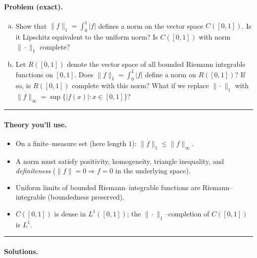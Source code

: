 \documentclass[12pt,a4paper]{article}
\theoremstyle{plain}
\theoremstyle{definition}
\theoremstyle{remark}
\theoremstyle{remark}
\begin{document}
\paragraph{Problem (exact).}
\begin{enumerate}[(a)]
	\item Show that $\|f\|_{1}=\int_{0}^{1}|f|$ defines a norm on the vector space $C([0,1])$.
	Is it Lipschitz equivalent to the uniform norm? Is $C([0,1])$ with norm $\|\cdot\|_{1}$ complete?
	
	\item Let $R([0,1])$ denote the vector space of all bounded Riemann integrable functions on $[0,1]$.
	Does $\|f\|_{1}=\int_{0}^{1}|f|$ define a norm on $R([0,1])$? If so, is $R([0,1])$ complete with this norm?
	What if we replace $\|\cdot\|_{1}$ with $\|f\|_{\infty}=\sup\{|f(x)|:x\in[0,1]\}$?
\end{enumerate}

\noindent\rule{\linewidth}{0.6pt}

\paragraph{Theory you’ll use.}
\begin{itemize}
	\item On a finite–measure set (here length $1$): $\displaystyle \|f\|_{1}\le \|f\|_{\infty}$.
	\item A norm must satisfy positivity, homogeneity, triangle inequality, and \emph{definiteness}
	($\|f\|=0 \Rightarrow f=0$ in the underlying space).
	\item Uniform limits of bounded Riemann–integrable functions are Riemann–integrable (boundedness preserved).
	\item $C([0,1])$ is dense in $L^{1}([0,1])$; the $\|\cdot\|_{1}$–completion of $C([0,1])$ is $L^{1}$.
\end{itemize}

\noindent\rule{\linewidth}{0.6pt}

\paragraph{Solutions.}
\end{document}
